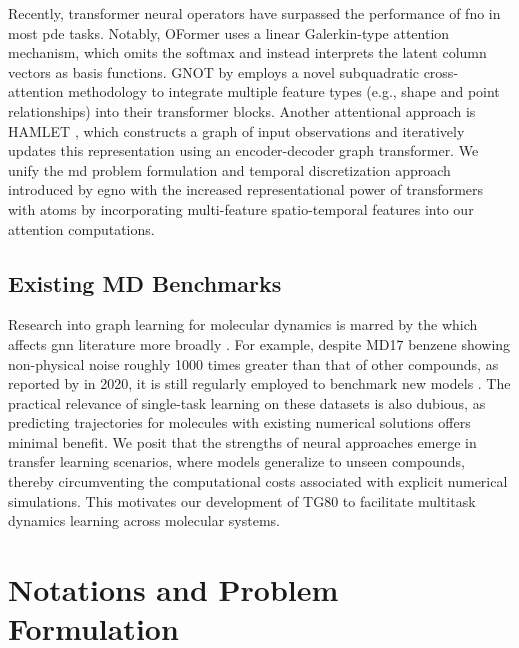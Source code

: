 Recently, transformer neural operators \cite{bryutkin_hamlet_2024,hao_gnot_2023,li_transformer_2023} have surpassed the performance of \gls{fno} in most \gls{pde} tasks. Notably, OFormer \cite{li_transformer_2023} uses a linear Galerkin-type attention mechanism, which omits the softmax and instead interprets the latent column vectors as basis functions. GNOT by \textcite{hao_gnot_2023} employs a novel subquadratic cross-attention methodology to integrate multiple feature types (e.g., shape and point relationships) into their transformer blocks. Another attentional approach is HAMLET \cite{bryutkin_hamlet_2024}, which constructs a graph of input observations and iteratively updates this representation using an encoder-decoder graph transformer. We unify the \gls{md} problem formulation and temporal discretization approach introduced by \gls{egno} with the increased representational power of transformers with \gls{atoms} by incorporating multi-feature spatio-temporal features into our attention computations.

\subsection{Existing MD Benchmarks}
Research into graph learning for molecular dynamics is marred by the  which affects \gls{gnn} literature more broadly \cite{bechler-speicher_position_2025}. For example, despite MD17 benzene showing non-physical noise roughly 1000 times greater than that of other compounds, as reported by \textcite{christensen_revised_2020} in 2020, it is still regularly employed to benchmark new models \cite{bihani_egraffbench_2023,huang_equivariant_2022,liao_equiformer_2023, xu_equivariant_2024}. The practical relevance of single-task learning on these datasets is also dubious, as predicting trajectories for molecules with existing numerical solutions offers minimal benefit. We posit that the strengths of neural approaches emerge in transfer learning scenarios, where models generalize to unseen compounds, thereby circumventing the computational costs associated with explicit numerical simulations. This motivates our development of TG80 to facilitate multitask dynamics learning across molecular systems.

\section{Notations and Problem Formulation}
